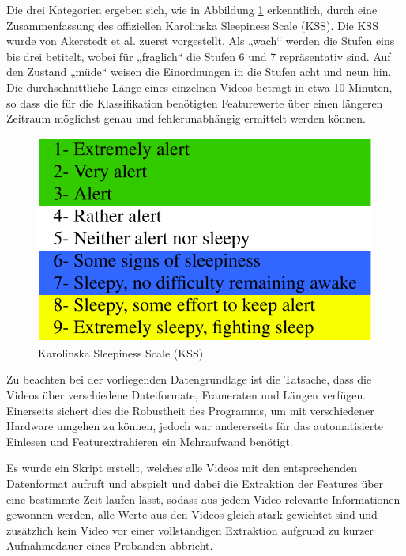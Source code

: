 Die drei Kategorien ergeben sich, wie in Abbildung \ref{fig:KSSScale} erkenntlich, durch eine Zusammenfassung des offiziellen Karolinska Sleepiness Scale (KSS). Die KSS wurde von Akerstedt et al. \cite{AK90} zuerst vorgestellt. Als „wach“ werden die Stufen eins bis drei betitelt, wobei für „fraglich“ die Stufen 6 und 7 repräsentativ sind. Auf den Zustand „müde“ weisen die Einordnungen in die Stufen acht und neun hin. Die durchschnittliche Länge eines einzelnen Videos beträgt in etwa 10 Minuten, so dass die für die Klassifikation benötigten Featurewerte über einen längeren Zeitraum möglichst genau und fehlerunabhängig ermittelt werden können. 

\begin{figure}
\centering
\includegraphics[width=\linewidth]{images/KSSScale.png}
\caption{Karolinska Sleepiness Scale (KSS)}
\label{fig:KSSScale}
\end{figure}

Zu beachten bei der vorliegenden Datengrundlage ist die Tatsache, dass die Videos über verschiedene Dateiformate, Frameraten und Längen verfügen. Einerseits sichert dies die Robustheit des Programms, um mit verschiedener Hardware umgehen zu können, jedoch war andererseits für das automatisierte Einlesen und Featurextrahieren ein Mehraufwand benötigt. 

Es wurde ein Skript erstellt, welches alle Videos mit den entsprechenden Datenformat aufruft und abspielt und dabei die Extraktion der Features über eine bestimmte Zeit laufen lässt, sodass aus jedem Video relevante Informationen gewonnen werden, alle Werte aus den Videos gleich stark gewichtet sind und zusätzlich kein Video vor einer vollständigen Extraktion aufgrund zu kurzer Aufnahmedauer eines Probanden abbricht.


